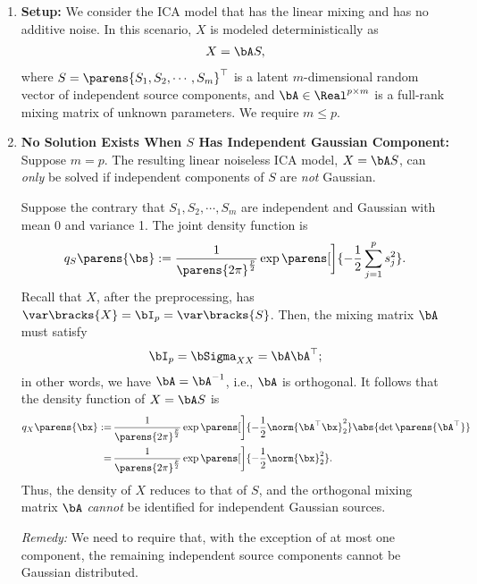 \documentclass[12pt]{article}
\begin{document}
\begin{enumerate}[label=\textbf{\arabic*.}]

	\item \textbf{Setup:} We consider the ICA model that has the linear mixing and has no additive noise. In this scenario, $X$ is modeled deterministically as 
	\begin{align*}
		X = \bA S, 
	\end{align*}
	where $S = \parens{S_1, S_2, \cdots, S_m}^\top$ is a latent $m$-dimensional random vector of independent source components, and $\bA \in \Real^{p \times m}$ is a full-rank mixing matrix of unknown parameters. We require $m \le p$. 
	
	\item \textbf{No Solution Exists When $S$ Has Independent Gaussian Component:} Suppose $m = p$. The resulting linear noiseless ICA model, $X = \bA S$, can \emph{only} be solved if independent components of $S$ are \emph{not} Gaussian. 
	
	Suppose the contrary that $S_1, S_2, \cdots, S_m$ are independent and Gaussian with mean 0 and variance 1. The joint density function is 
	\begin{align*}
		q_S \parens{\bs} := \frac{1}{\parens{2\pi}^{\frac{p}{2}}} \exp \parens[\bigg]{ - \frac{1}{2} \sum_{j=1}^p s_j^2}. 
	\end{align*}
	Recall that $X$, after the preprocessing, has $\var \bracks{X} = \bI_p = \var \bracks{S}$. Then, the mixing matrix $\bA$ must satisfy 
	\begin{align*}
		\bI_p = \bSigma_{XX} = \bA \bA^\top; 
	\end{align*}
	in other words, we have $\bA = \bA^{-1}$, i.e., $\bA$ is orthogonal. It follows that the density function of $X = \bA S$ is 
	\begin{align*}
		q_X \parens{\bx} := & \, \frac{1}{\parens{2 \pi}^{\frac{p}{2}}} \exp \parens[\bigg]{-\frac{1}{2} \norm{\bA^\top \bx}_2^2} \abs{ \det \parens{\bA^\top }} \\ 
		= & \, \frac{1}{\parens{2 \pi}^{\frac{p}{2}}} \exp \parens[\bigg]{-\frac{1}{2} \norm{\bx}_2^2}. 
	\end{align*}
	Thus, the density of $X$ reduces to that of $S$, and the orthogonal mixing matrix $\bA$ \emph{cannot} be identified for independent Gaussian sources. 
	
	\textit{Remedy:} We need to require that, with the exception of at most one component, the remaining independent source components cannot be Gaussian distributed. 
	

\end{enumerate}
\end{document}
